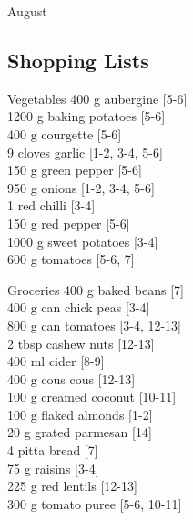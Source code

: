 \begin{menu}{August}
    \subsection*{Shopping Lists}
      \begin{shoppinglist}{Vegetables}
      400 g aubergine 
        {\scriptsize[5-6]}\\
      1200 g baking potatoes 
        {\scriptsize[5-6]}\\
      400 g courgette 
        {\scriptsize[5-6]}\\
      9 cloves garlic 
        {\scriptsize[1-2, 3-4, 5-6]}\\
      150 g green pepper 
        {\scriptsize[5-6]}\\
      950 g onions 
        {\scriptsize[1-2, 3-4, 5-6]}\\
      1  red chilli 
        {\scriptsize[3-4]}\\
      150 g red pepper 
        {\scriptsize[5-6]}\\
      1000 g sweet potatoes 
        {\scriptsize[3-4]}\\
      600 g tomatoes 
        {\scriptsize[5-6, 7]}\\
      \end{shoppinglist}%
      \begin{shoppinglist}{Groceries}
      400 g baked beans 
        {\scriptsize[7]}\\
      400 g can chick peas 
        {\scriptsize[3-4]}\\
      800 g can tomatoes 
        {\scriptsize[3-4, 12-13]}\\
      2 tbsp cashew nuts 
        {\scriptsize[12-13]}\\
      400 ml cider 
        {\scriptsize[8-9]}\\
      400 g cous cous 
        {\scriptsize[12-13]}\\
      100 g creamed coconut 
        {\scriptsize[10-11]}\\
      100 g flaked almonds 
        {\scriptsize[1-2]}\\
      20 g grated parmesan 
        {\scriptsize[14]}\\
      4  pitta bread 
        {\scriptsize[7]}\\
      75 g raisins 
        {\scriptsize[3-4]}\\
      225 g red lentils 
        {\scriptsize[12-13]}\\
      300 g tomato puree 
        {\scriptsize[5-6, 10-11]}\\

\end{shoppinglist}
\end{menu}
